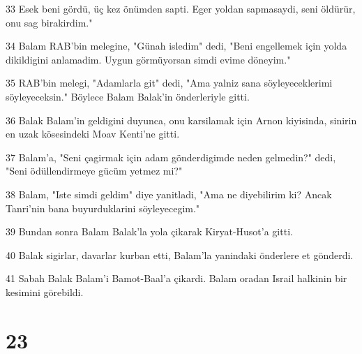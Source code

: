 \par 33 Esek beni gördü, üç kez önümden sapti. Eger yoldan sapmasaydi, seni öldürür, onu sag birakirdim."
\par 34 Balam RAB'bin melegine, "Günah isledim" dedi, "Beni engellemek için yolda dikildigini anlamadim. Uygun görmüyorsan simdi evime döneyim."
\par 35 RAB'bin melegi, "Adamlarla git" dedi, "Ama yalniz sana söyleyeceklerimi söyleyeceksin." Böylece Balam Balak'in önderleriyle gitti.
\par 36 Balak Balam'in geldigini duyunca, onu karsilamak için Arnon kiyisinda, sinirin en uzak kösesindeki Moav Kenti'ne gitti.
\par 37 Balam'a, "Seni çagirmak için adam gönderdigimde neden gelmedin?" dedi, "Seni ödüllendirmeye gücüm yetmez mi?"
\par 38 Balam, "Iste simdi geldim" diye yanitladi, "Ama ne diyebilirim ki? Ancak Tanri'nin bana buyurduklarini söyleyecegim."
\par 39 Bundan sonra Balam Balak'la yola çikarak Kiryat-Husot'a gitti.
\par 40 Balak sigirlar, davarlar kurban etti, Balam'la yanindaki önderlere et gönderdi.
\par 41 Sabah Balak Balam'i Bamot-Baal'a çikardi. Balam oradan Israil halkinin bir kesimini görebildi.

\chapter{23}

